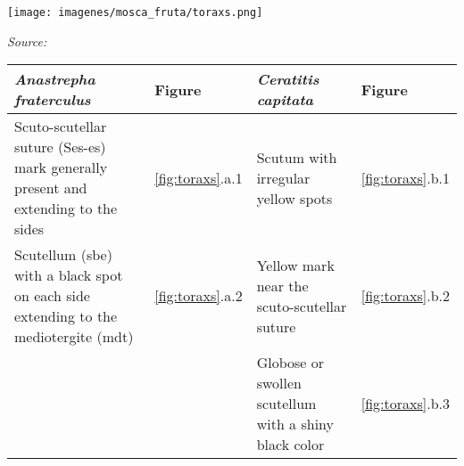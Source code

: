 \begin{figure*}[htbp]
    \centering
    \texttt{[image: imagenes/mosca\_fruta/toraxs.png]}
    \caption{a. Thorax of \textit{Anastrepha fraterculus} b. Thorax of \textit{Ceratitis capitata}.}
    \scriptsize \textit{Source:} \cite{especiesImEco}
    \label{fig:toraxs}
\end{figure*}

\begin{table*}[htbp]
	\centering
	\caption{Differences in the thorax. \cite{senasaTephritidae, senasaAnastrepha, especiesImEco}}
	\label{tab:diferenciastorax}
	\begin{tabular}{|p{}|p{}|p{}|p{}|}
		\hline
		\textbf{\textit{Anastrepha fraterculus}} & \textbf{Figure} & \textbf{\textit{Ceratitis capitata}} & \textbf{Figure} \\
		\hline
		Scuto-scutellar suture (Ses-es) mark generally present and extending to the sides & \ref{fig:toraxs}.a.1 & Scutum with irregular yellow spots & \ref{fig:toraxs}.b.1 \\
		\hline
		Scutellum (sbe) with a black spot on each side extending to the mediotergite (mdt) & \ref{fig:toraxs}.a.2 & Yellow mark near the scuto-scutellar suture & \ref{fig:toraxs}.b.2 \\
		\hline
		& & Globose or swollen scutellum with a shiny black color & \ref{fig:toraxs}.b.3 \\
		\hline
	\end{tabular}
\end{table*}